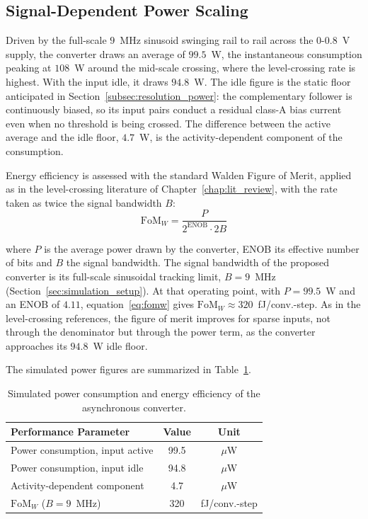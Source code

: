 \subsection{Signal-Dependent Power Scaling}

Driven by the full-scale $9$~MHz sinusoid swinging rail to rail across the $0$-$0.8$~V supply, the converter draws an average of $99.5$~\textmu W, the instantaneous consumption peaking at $108$~\textmu W around the mid-scale crossing, where the level-crossing rate is highest. With the input idle, it draws $94.8$~\textmu W. The idle figure is the static floor anticipated in Section~\ref{subsec:resolution_power}: the complementary follower is continuously biased, so its input pairs conduct a residual class-A bias current even when no threshold is being crossed. The difference between the active average and the idle floor, $4.7$~\textmu W, is the activity-dependent component of the consumption.

Energy efficiency is assessed with the standard Walden Figure of Merit, applied as in the level-crossing literature of Chapter~\ref{chap:lit_review}, with the rate taken as twice the signal bandwidth $B$:
\begin{equation}
    \mathrm{FoM}_W = \frac{P}{2^{\mathrm{ENOB}} \cdot 2B}
    \label{eq:fomw}
\end{equation}

where $P$ is the average power drawn by the converter, ENOB its effective number of bits and $B$ the signal bandwidth. The signal bandwidth of the proposed converter is its full-scale sinusoidal tracking limit, $B = 9$~MHz (Section~\ref{sec:simulation_setup}). At that operating point, with $P = 99.5$~\textmu W and an ENOB of $4.11$, equation~\eqref{eq:fomw} gives $\mathrm{FoM}_W \approx 320$~fJ/conv.-step. As in the level-crossing references, the figure of merit improves for sparse inputs, not through the denominator but through the power term, as the converter approaches its $94.8$~\textmu W idle floor.

The simulated power figures are summarized in Table~\ref{tab:power_metrics_empty}.

\begin{table}[htbp]
    \centering
    \caption{Simulated power consumption and energy efficiency of the asynchronous converter.}
    \label{tab:power_metrics_empty}
    \renewcommand{\arraystretch}{1.4}
    \begin{tabular}{lcc}
        \toprule
        \textbf{Performance Parameter}           & \textbf{Value} & \textbf{Unit}         \\
        \midrule
        Power consumption, input active          & 99.5           & $\mu$W                \\
        Power consumption, input idle            & 94.8           & $\mu$W                \\
        Activity-dependent component             & 4.7            & $\mu$W                \\
        \midrule
        $\mathrm{FoM}_{W}$ ($B = 9$~MHz)         & 320            & fJ/conv.-step         \\
        \bottomrule
    \end{tabular}
\end{table}

